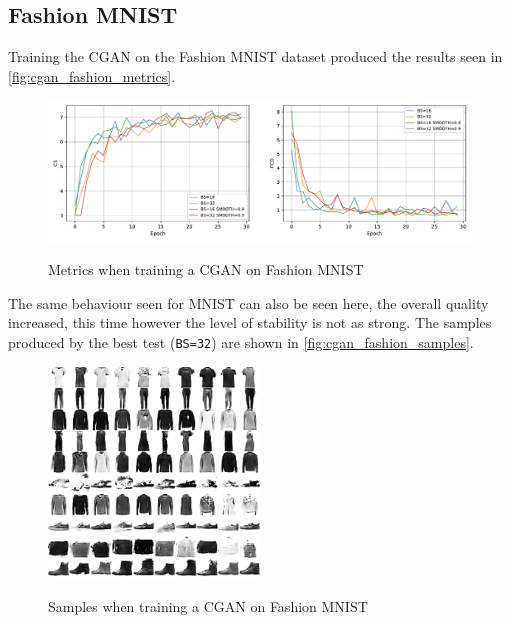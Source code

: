 \subsection{Fashion MNIST}
Training the \gls{CGAN} on the Fashion MNIST dataset produced the results seen in \autoref{fig:cgan_fashion_metrics}.
\begin{figure}[hbt]
    \centering
    \caption{Metrics when training a CGAN on Fashion MNIST}
    \includegraphics[width=\textwidth]{chapters/Experiments/CGAN/fashion_metrics.pdf}
    \label{fig:cgan_fashion_metrics}
\end{figure}

The same behaviour seen for \gls{MNIST} can also be seen here, the overall quality increased, this time however the level of stability is not as strong. The samples produced by the best test (\texttt{BS=32}) are shown in \autoref{fig:cgan_fashion_samples}.
\begin{figure}[hbt]
    \centering
    \caption{Samples when training a CGAN on Fashion MNIST}
    \includegraphics[width=0.5\textwidth]{chapters/Experiments/CGAN/fashion_samples.png}
    \label{fig:cgan_fashion_samples}
\end{figure}


